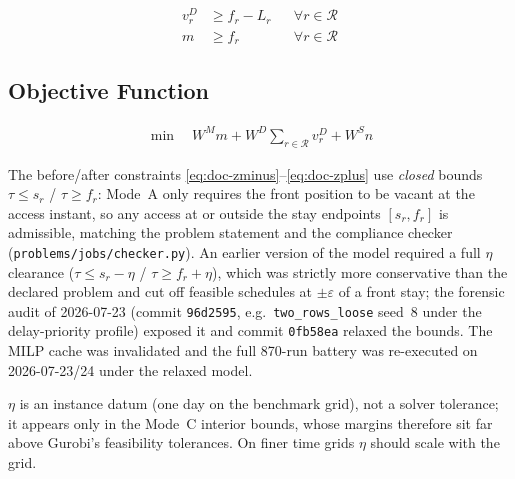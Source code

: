 \begin{align}
v^{D}_r &\ge f_r - L_r
&& \forall r \in \mathcal{R} \\
m &\ge f_r
&& \forall r \in \mathcal{R}
\end{align}

\subsection{Objective Function}

\begin{align}
\min \quad W^{M} m + W^{D} \sum_{r \in \mathcal{R}} v^{D}_{r} + W^{S} n
\end{align}

\begin{remark}
The before/after constraints
\eqref{eq:doc-zminus}--\eqref{eq:doc-zplus} use \emph{closed} bounds
$\tau \le s_r$ / $\tau \ge f_r$: Mode~A only requires the front
position to be vacant at the access instant, so any access at or
outside the stay endpoints $[s_r, f_r]$ is admissible, matching the
problem statement and the compliance checker
(\texttt{problems/jobs/checker.py}).  An earlier version of the model
required a full $\eta$ clearance ($\tau \le s_r - \eta$ /
$\tau \ge f_r + \eta$), which was strictly more conservative than the
declared problem and cut off feasible schedules at $\pm\varepsilon$ of
a front stay; the forensic audit of 2026-07-23 (commit
\texttt{96d2595}, e.g.\ \texttt{two\_rows\_loose} seed~8 under the
delay-priority profile) exposed it and commit \texttt{0fb58ea} relaxed
the bounds.  The MILP cache was invalidated and the full 870-run
battery was re-executed on 2026-07-23/24 under the relaxed model.
\end{remark}

\begin{remark}
$\eta$ is an instance datum (one day on the benchmark grid), not a
solver tolerance; it appears only in the Mode~C interior bounds, whose
margins therefore sit far above Gurobi's feasibility tolerances.  On
finer time grids $\eta$ should scale with the grid.
\end{remark}
